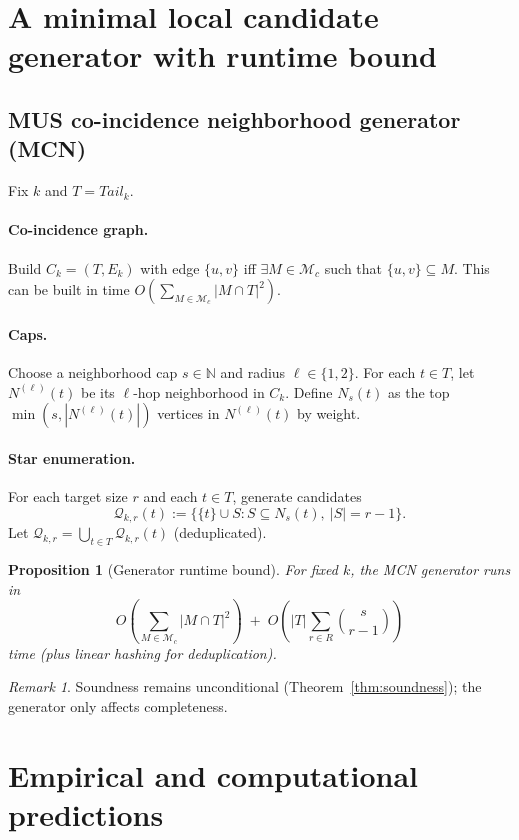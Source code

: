 \documentclass[11pt]{article}
\theoremstyle{definition}
\theoremstyle{plain}
\newtheorem{proposition}{Proposition}[section]
\theoremstyle{remark}
\newtheorem{remark}{Remark}[section]
\newcommand{\bbN}{\mathbb{N}}
\begin{document}
\section{A minimal local candidate generator with runtime bound}

\subsection{MUS co-incidence neighborhood generator (MCN)}
Fix $k$ and $T=Tail_k$.

\paragraph{Co-incidence graph.}
Build $C_k=(T,E_k)$ with edge $\{u,v\}$ iff $\exists M\in\mathcal M_c$ such that $\{u,v\}\subseteq M$.
This can be built in time $O(\sum_{M\in\mathcal M_c} |M\cap T|^2)$.

\paragraph{Caps.}
Choose a neighborhood cap $s\in\bbN$ and radius $\ell\in\{1,2\}$.
For each $t\in T$, let $N^{(\ell)}(t)$ be its $\ell$-hop neighborhood in $C_k$.
Define $N_s(t)$ as the top $\min(s,|N^{(\ell)}(t)|)$ vertices in $N^{(\ell)}(t)$ by weight.

\paragraph{Star enumeration.}
For each target size $r$ and each $t\in T$, generate candidates
\[
\mathcal Q_{k,r}(t):=\{\{t\}\cup S: S\subseteq N_s(t),\ |S|=r-1\}.
\]
Let $\mathcal Q_{k,r}=\bigcup_{t\in T}\mathcal Q_{k,r}(t)$ (deduplicated).

\begin{proposition}[Generator runtime bound]
For fixed $k$, the MCN generator runs in
\[
O\!\left(\sum_{M\in\mathcal M_c} |M\cap T|^2\right)
\;+\;
O\!\left(|T|\sum_{r\in R}\binom{s}{r-1}\right)
\]
time (plus linear hashing for deduplication).
\end{proposition}

\begin{remark}
Soundness remains unconditional (Theorem~\ref{thm:soundness}); the generator only affects completeness.
\end{remark}

\section{Empirical and computational predictions}
\end{document}
